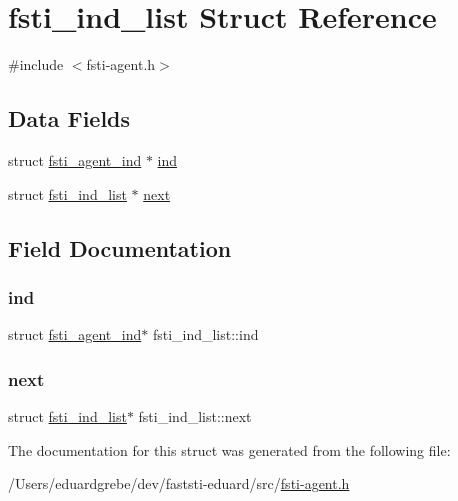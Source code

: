 \hypertarget{structfsti__ind__list}{}\section{fsti\+\_\+ind\+\_\+list Struct Reference}
\label{structfsti__ind__list}


{\ttfamily \#include $<$fsti-\/agent.\+h$>$}

\subsection*{Data Fields}
\begin{DoxyCompactItemize}
\item 
struct \mbox{\hyperlink{structfsti__agent__ind}{fsti\+\_\+agent\+\_\+ind}} $\ast$ \mbox{\hyperlink{structfsti__ind__list_a0eecb3b3d6ceef9b204fd869ec33e35b}{ind}}
\item 
struct \mbox{\hyperlink{structfsti__ind__list}{fsti\+\_\+ind\+\_\+list}} $\ast$ \mbox{\hyperlink{structfsti__ind__list_a98e94b5030efc261759e3e39660bedca}{next}}
\end{DoxyCompactItemize}


\subsection{Field Documentation}
\mbox{\label{structfsti__ind__list_a0eecb3b3d6ceef9b204fd869ec33e35b}} 
\subsubsection{\texorpdfstring{ind}{ind}}
{\footnotesize\ttfamily struct \mbox{\hyperlink{structfsti__agent__ind}{fsti\+\_\+agent\+\_\+ind}}$\ast$ fsti\+\_\+ind\+\_\+list\+::ind}

\mbox{\label{structfsti__ind__list_a98e94b5030efc261759e3e39660bedca}} 
\subsubsection{\texorpdfstring{next}{next}}
{\footnotesize\ttfamily struct \mbox{\hyperlink{structfsti__ind__list}{fsti\+\_\+ind\+\_\+list}}$\ast$ fsti\+\_\+ind\+\_\+list\+::next}



The documentation for this struct was generated from the following file\+:\begin{DoxyCompactItemize}
\item 
/\+Users/eduardgrebe/dev/faststi-\/eduard/src/\mbox{\hyperlink{fsti-agent_8h}{fsti-\/agent.\+h}}\end{DoxyCompactItemize}
